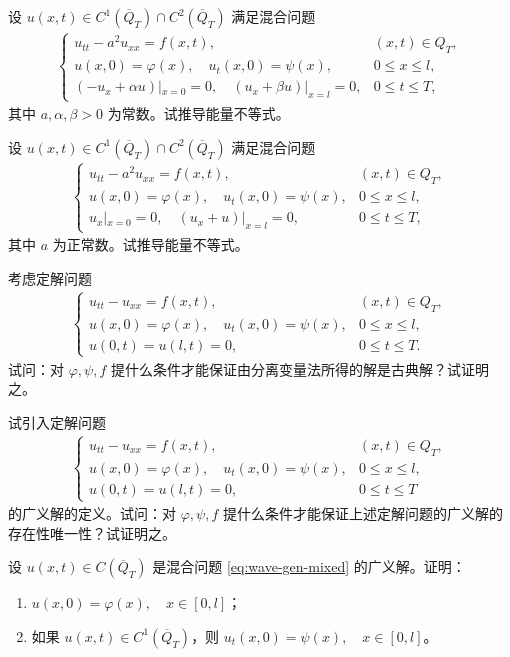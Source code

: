 \documentclass[../../main.tex]{subfiles}%
\begin{document}
\begin{example}
设 $u(x,t)\in C^1(\overline{Q}_T)\cap C^2(\overline{Q}_T)$ 满足混合问题
\begin{align*}
\begin{cases}
u_{tt}-a^2u_{xx}=f(x,t), & (x,t)\in Q_T, \\
u(x,0)=\varphi(x),\quad u_t(x,0)=\psi(x), & 0\leqslant x\leqslant l, \\
(-u_x+\alpha u)|_{x=0}=0,\quad (u_x+\beta u)|_{x=l}=0, & 0\leqslant t\leqslant T,
\end{cases}
\end{align*}
其中 $a,\alpha,\beta>0$ 为常数。试推导能量不等式。
\end{example}

\begin{example}
设 $u(x,t)\in C^1(\overline{Q}_T)\cap C^2(\overline{Q}_T)$ 满足混合问题
\begin{align*}
\begin{cases}
u_{tt}-a^2u_{xx}=f(x,t), & (x,t)\in Q_T, \\
u(x,0)=\varphi(x),\quad u_t(x,0)=\psi(x), & 0\leqslant x\leqslant l, \\
u_x|_{x=0}=0,\quad (u_x+u)|_{x=l}=0, & 0\leqslant t\leqslant T,
\end{cases}
\end{align*}
其中 $a$ 为正常数。试推导能量不等式。
\end{example}

\begin{example}
考虑定解问题
\begin{align*}
\begin{cases}
u_{tt}-u_{xx}=f(x,t), & (x,t)\in Q_T, \\
u(x,0)=\varphi(x),\quad u_t(x,0)=\psi(x), & 0\leqslant x\leqslant l, \\
u(0,t)=u(l,t)=0, & 0\leqslant t\leqslant T.
\end{cases}
\end{align*}
试问：对 $\varphi,\psi,f$ 提什么条件才能保证由分离变量法所得的解是古典解？试证明之。
\end{example}

\begin{example}
试引入定解问题
\begin{align*}
\begin{cases}
u_{tt}-u_{xx}=f(x,t), & (x,t)\in Q_T, \\
u(x,0)=\varphi(x),\quad u_t(x,0)=\psi(x), & 0\leqslant x\leqslant l, \\
u(0,t)=u(l,t)=0, & 0\leqslant t\leqslant T
\end{cases}
\end{align*}
的广义解的定义。试问：对 $\varphi,\psi,f$ 提什么条件才能保证上述定解问题的广义解的存在性唯一性？试证明之。
\end{example}

\begin{example}
设 $u(x,t)\in C(\overline{Q}_T)$ 是混合问题 \eqref{eq:wave-gen-mixed} 的广义解。证明：
\begin{enumerate}[(1)]
\item $u(x,0)=\varphi(x),\quad x\in[0,l]$；
\item 如果 $u(x,t)\in C^1(\overline{Q}_T)$，则 $u_t(x,0)=\psi(x),\quad x\in[0,l]$。
\end{enumerate}
\end{example}
\end{document}
